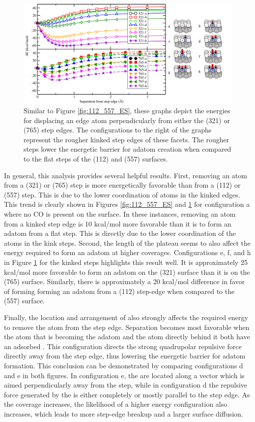 \begin{landscape}
\begin{figure}[p!]
  \centering
  \includegraphics[width=0.75\linewidth]{../figures/chap4/321_765_EnergySeparation_CO.pdf}
  \caption{Similar to Figure \ref{fig:112_557_ES}, these graphs depict the
energies for displacing an edge atom perpendicularly from either the (321) or
(765) step edges. The configurations to the right of the graphs represent the
rougher kinked step edges of these facets. The rougher steps lower the 
energetic barrier for adatom creation when compared to the flat steps of the
(112) and (557) surfaces.}
\label{fig:321_765_ES}
\end{figure}
\end{landscape}

In general, this analysis provides several helpful results. First, removing an
atom from a (321) or (765) step is more energetically favorable than from a
(112) or (557) step. This is due to the lower coordination of atoms in
the kinked edges. This trend is clearly shown in Figures \ref{fig:112_557_ES}
and \ref{fig:321_765_ES} for configuration a where no CO is present on the
surface. In these instances, removing an atom from a kinked step edge is 10
kcal/mol more favorable than it is to form an adatom from a flat step. This is
directly due to the lower coordination of the atoms in the kink steps.
Second, the length of the plateau seems to also affect the energy required to form
an adatom at higher coverages.  Configurations e, f, and h in Figure
\ref{fig:321_765_ES} for the kinked steps highlights this result well. It is
approximately 25 kcal/mol more favorable to form an adatom on the (321) surface
than it is on the (765) surface. Similarly, there is approximately a 20
kcal/mol difference in favor of forming  forming an adatom from a (112) step-edge when
compared to the (557) surface.

Finally, the location and arrangement of  also strongly affects the
required energy to remove the atom from the step edge. Separation becomes most
favorable when the atom that is becoming the adatom and the atom directly
behind it both have an adsorbed . This configuration directs the strong
quadrupolar repulsive force directly away from the step edge, thus lowering the
energetic barrier for adatom formation.  This conclusion can be demonstrated by
comparing configurations d and e in both figures. In configuration e, the
 are located along a vector which is aimed perpendicularly away from the
step, while in configuration d the repulsive force generated by the  is
either completely or mostly parallel to the step edge. As the coverage
increases, the likelihood of a higher energy configuration also increases,
which leads to more step-edge breakup and a larger surface diffusion.


